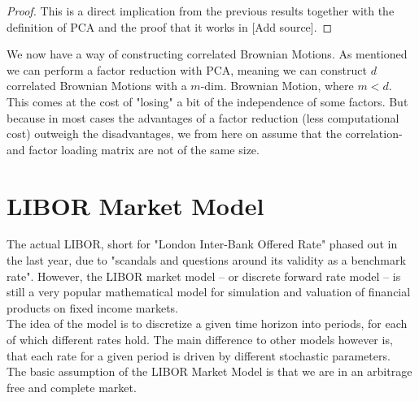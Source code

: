 \documentclass[12pt]{article}
\begin{document}
	\begin{proof}
		This is a direct implication from the previous results together with the definition of PCA and the proof that it works in \color{red}[Add source]\color{black}. %
	\end{proof}
	We now have a way of constructing correlated Brownian Motions. As mentioned we can perform a factor reduction with PCA, meaning we can construct $d$ correlated Brownian Motions with a $m$-dim. Brownian Motion, where $m < d$. This comes at the cost of "losing" a bit of the independence of some factors. But because in most cases the advantages of a factor reduction (less computational cost) outweigh the disadvantages, we from here on assume that the correlation- and factor loading matrix are not of the same size.
	
	
	
	
	\pagebreak
	\section{LIBOR Market Model}\label{sec::LIBORModel}
	
	The actual LIBOR, short for "London Inter-Bank Offered Rate" phased out in the last year, due to "scandals and questions around its validity as a benchmark rate"\cite{investopediaLIBOR}.
	However, the LIBOR market model -- or discrete forward rate model -- is still a very popular mathematical model for simulation and valuation of financial products on fixed income markets.\\
	The idea of the model is to discretize a given time horizon into periods, for each of which different rates hold. The main difference to other models however is, that each rate for a given period is driven by different stochastic parameters.
	\\
	The basic assumption of the LIBOR Market Model is that we are in an arbitrage free and complete market.
	
\end{document}
